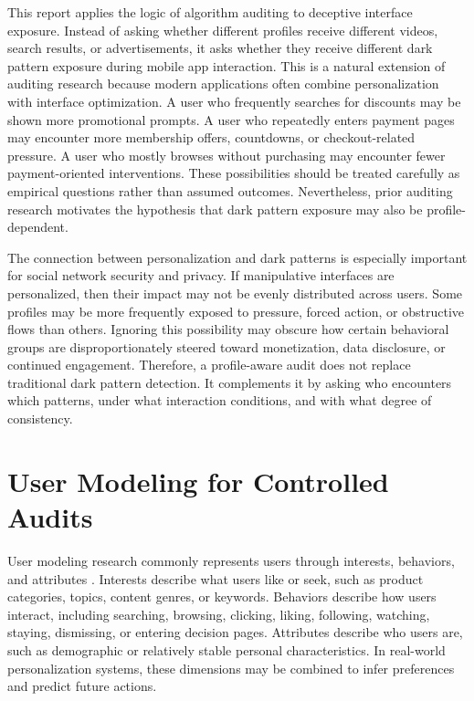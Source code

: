 This report applies the logic of algorithm auditing to deceptive interface exposure. Instead of asking whether different profiles receive different videos, search results, or advertisements, it asks whether they receive different dark pattern exposure during mobile app interaction. This is a natural extension of auditing research because modern applications often combine personalization with interface optimization. A user who frequently searches for discounts may be shown more promotional prompts. A user who repeatedly enters payment pages may encounter more membership offers, countdowns, or checkout-related pressure. A user who mostly browses without purchasing may encounter fewer payment-oriented interventions. These possibilities should be treated carefully as empirical questions rather than assumed outcomes. Nevertheless, prior auditing research motivates the hypothesis that dark pattern exposure may also be profile-dependent.

The connection between personalization and dark patterns is especially important for social network security and privacy. If manipulative interfaces are personalized, then their impact may not be evenly distributed across users. Some profiles may be more frequently exposed to pressure, forced action, or obstructive flows than others. Ignoring this possibility may obscure how certain behavioral groups are disproportionately steered toward monetization, data disclosure, or continued engagement. Therefore, a profile-aware audit does not replace traditional dark pattern detection. It complements it by asking who encounters which patterns, under what interaction conditions, and with what degree of consistency.

\section{User Modeling for Controlled Audits}

User modeling research commonly represents users through interests, behaviors, and attributes \cite{eke2019userprofiling,piao2018interests,purificato2024usermodeling}. Interests describe what users like or seek, such as product categories, topics, content genres, or keywords. Behaviors describe how users interact, including searching, browsing, clicking, liking, following, watching, staying, dismissing, or entering decision pages. Attributes describe who users are, such as demographic or relatively stable personal characteristics. In real-world personalization systems, these dimensions may be combined to infer preferences and predict future actions.

